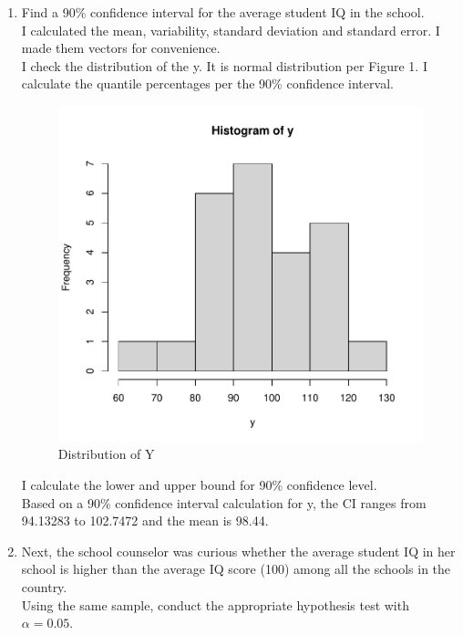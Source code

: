 \documentclass[12pt,letterpaper]{article}
\begin{document}
\begin{enumerate}
	\item Find a 90\% confidence interval for the average student IQ in the school.\\
	
	\noindent I calculated the mean, variability, standard deviation and standard error. I made them vectors for convenience. \\
	  
	\noindent  I check the distribution of the y. It is normal distribution per Figure 1. I calculate the quantile percentages per the 90\% confidence interval. \\
		\begin{figure}[h!]\centering
		\caption{\footnotesize Distribution of Y}
		\label{fig:plot_1}
		\includegraphics[width=.75\textwidth]{plot1.pdf}
		\end{figure}
		
	\noindent I calculate the lower and upper bound for 90\% confidence level. \\  
	
	\noindent Based on a 90\% confidence interval calculation for y, the CI ranges from 94.13283 to 102.7472 and the mean is 98.44. \\ 
	
	\item Next, the school counselor was curious  whether  the average student IQ in her school is higher than the average IQ score (100) among all the schools in the country.\\ 
	\noindent Using the same sample, conduct the appropriate hypothesis test with $\alpha=0.05$. \\



\end{enumerate}
\end{document}
